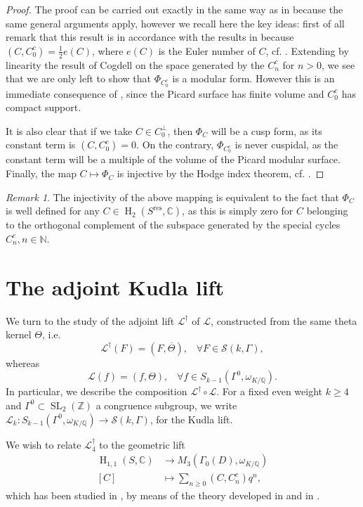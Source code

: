 \documentclass[12pt,a4paper,reqno]{amsart}
\theoremstyle{definition}
\numberwithin{definition}{subsection}
\theoremstyle{definition}
\numberwithin{Definition}{subsection}
\theoremstyle{remark}
\theoremstyle{remark}
\newtheorem{Remark}{Remark}
\numberwithin{Remark}{subsection}
\theoremstyle{remark}
\theoremstyle{plain}
\numberwithin{Theorem}{subsection}
\theoremstyle{plain}
\theoremstyle{plain}
\theoremstyle{plain}
\theoremstyle{plain}
\theoremstyle{plain}
\theoremstyle{plain}
\theoremstyle{plain}
\newcommand*{\N}{\mathbb{N}}
\newcommand*{\Z}{\mathbb{Z}}
\newcommand*{\Q}{\mathbb{Q}}
\newcommand*{\Cc}{\mathbb{C}}
\DeclareMathOperator{\SL}{SL}
\DeclareMathOperator{\h}{H}
\begin{document}
\begin{proof}
The proof can be carried out exactly in the same way as in \cite[p. 107]{hirzebruch} because the same general arguments apply, however we recall here the key ideas:
first of all remark that this result is in accordance with the results in \cite{cogdell} because $(C,C_0^c)=\frac{1}{2}e(C)$, where $e(C)$ is the Euler number of $C$, cf. \cite[p. 195]{kudlaint}. Extending by linearity the result of Cogdell on the space generated by the $C_n^c$ for $n>0$, we see that we are only left to show that $\Phi_{C_0^c}$ is a modular form. However this is an immediate consequence of \cite[p. 124]{km}, since the Picard surface has finite volume and $C_0^c$ has compact support.

It is also clear that if we take $C\in C_0^\perp$, then $\Phi_C$ will be a cusp form, as its constant term is $(C,C_0^c)=0$. On the contrary, $\Phi_{C_0^c}$ is never cuspidal, as the constant term will be a multiple of the volume of the Picard modular surface. Finally, the map $C\mapsto \Phi_C$ is injective by the Hodge index theorem, cf. \cite[p. 107]{hirzebruch}.
\end{proof}

\begin{Remark}
The injectivity of the above mapping is equivalent to the fact that $\Phi_C$ is well defined for any $C\in \h_2(S^{\text{res}},\Cc)$, as this is simply zero for $C$ belonging to the orthogonal complement of the subspace generated by the special cycles $C_n^c, n\in \N$.
\end{Remark}

\section{The adjoint Kudla lift}
We turn to the study of the adjoint lift $\mathcal{L}^\dagger$ of $\mathcal{L}$, constructed from the same theta kernel $\Theta$, i.e.
\[
\mathcal{L}^\dagger(F)=(F,\overline{\Theta}), \;\;\; \forall F\in \mathscr{S}(k,\Gamma),
\]
whereas
\[
\mathcal{L}(f)=(f,\Theta), \;\;\; \forall f\in S_{k-1}(\Gamma^0,\omega_{K/\Q}).
\] 
In particular, we describe the composition $\mathcal{L}^\dagger\circ \mathcal{L}$. For a fixed even weight $k\geq 4$ and $\Gamma^0\subset \SL_2(\Z)$ a congruence subgroup, we write $\mathcal{L}_k:S_{k-1}(\Gamma^0,\omega_{K/\Q})\to \mathscr{S}(k,\Gamma)$, for the Kudla lift.

We wish to relate $\mathcal{L}_4^\dagger$ to the geometric lift
\begin{align*}
\h_{1,1}(S, \Cc)&\to M_3(\Gamma_0(D),\omega_{K/\Q})\\
[C]&\mapsto\sum_{n\geq 0}(C,C_n^c)q^n,
\end{align*}
which has been studied in \cite{cogdell}, by means of the theory developed in \cite{km} and in \cite{tongwang}.
\end{document}
